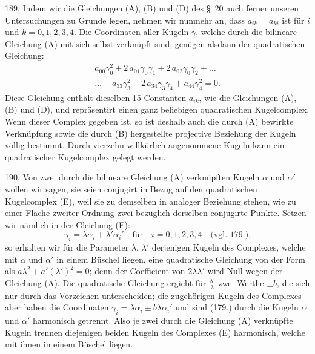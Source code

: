 \begin{center}
\makebox[15em]{\hrulefill}
\end{center}

\label{p21}


\hspace{\parindent}%
189. Indem wir die Gleichungen (A), (B) und (D) des
\S~20 auch ferner unseren Untersuchungen zu Grunde legen,
nehmen wir nunmehr an, dass $a_{ik}=a_{ki}$ ist f\"ur $i$ und $k =
0, 1, 2, 3, 4$. Die Coordinaten aller Kugeln $\gamma$, welche durch
die bilineare Gleichung (A) mit sich selbst verkn\"upft sind,
gen\"ugen alsdann der quadratischen Gleichung:
\begin{gather*}
a_{00} \gamma_0^2 + 2 \, a_{01}\gamma_0\gamma_1 + 2 \, a_{02}\gamma_0\gamma_2 +\ldots
\tag{E} \\
\ldots + a_{33}\gamma_3^2 + 2 \, a_{34}\gamma_3\gamma_4 + a_{44}\gamma_4^2 =0.
\end{gather*}
Diese Gleichung enth\"alt dieselben 15 Constanten $a_{ik}$, wie
die Gleichungen (A), (B) und (D), und repr\"asentirt einen
ganz beliebigen quadratischen Kugelcomplex. Wenn dieser
Complex gegeben ist, so ist deshalb auch die durch (A) bewirkte
Verkn\"upfung sowie die durch (B) hergestellte projective
Beziehung der Kugeln v\"ollig bestimmt. Durch vierzehn
willk\"urlich angenommene Kugeln kann ein quadratischer
Kugelcomplex gelegt werden.

190. Von zwei durch die bilineare Gleichung (A) verkn\"upften
Kugeln $\alpha$ und $\alpha'$ wollen wir sagen, sie seien {\glqq}conjugirt{\grqq}
in Bezug auf den quadratischen Kugelcomplex (E),
weil sie zu demselben in analoger Beziehung stehen, wie zu
einer Fl\"ache zweiter Ordnung zwei bez\"uglich derselben conjugirte
Punkte. Setzen wir n\"amlich in der Gleichung (E):
\[
\gamma_i=\lambda\alpha_i + \lambda'\alpha_i'
\quad\text{f\"ur}\quad
i = 0, 1, 2, 3, 4 \quad\text{(vgl. 179.),}
\]
so erhalten wir f\"ur die Parameter $\lambda$, $\lambda'$ derjenigen
Kugeln des Complexes, welche mit $\alpha$ und $\alpha'$ in einem B\"uschel liegen,
eine quadratische Gleichung von der Form als $a\lambda^2+a'(\lambda')^2 = 0$;
denn der Coefficient von $2\lambda\lambda'$ wird Null wegen der Gleichung
(A). Die quadratische Gleichung ergiebt f\"ur $\frac{\lambda'}{\lambda}$ zwei
Werthe $\pm b$, die sich nur durch das Vorzeichen unterscheiden;
die zugeh\"origen Kugeln des Complexes aber haben die Coordinaten
$\gamma_i=\lambda\alpha_i\pm b\lambda\alpha_i'$ und sind (179.) durch die Kugeln
$\alpha$ und $\alpha'$ harmonisch getrennt. Also je zwei durch die
Gleichung (A) verkn\"upfte Kugeln trennen diejenigen beiden
Kugeln des Complexes (E) harmonisch, welche mit ihnen
in einem B\"uschel liegen.


